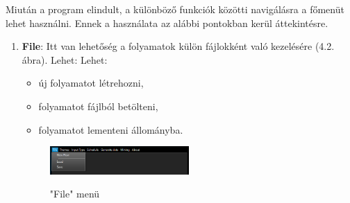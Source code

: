 
Miután a program elindult, a különböző funkciók közötti navigálásra a főmenüt lehet használni. Ennek a használata az alábbi pontokban kerül áttekintésre.
\begin{enumerate}
	\item{
		\textbf{File}: Itt van lehetőség a folyamatok külön fájlokként való kezelésére (4.2. ábra). Lehet:
		Lehet: 
		\begin{itemize}
			\item{új folyamatot létrehozni,}
			\item{folyamatot fájlból betölteni,}
			\item{folyamatot lementeni állományba.}
		\end{itemize}

		\begin{figure}[h]
			\begin{center}
				\includegraphics[width=0.5\textwidth, keepaspectratio=true]{images/img_ui_file}\\
				\caption{"File" menü}
				\label{fig:example}
			\end{center}
		\end{figure}

}
\end{enumerate}
